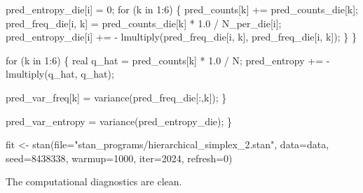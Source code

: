 \documentclass[
  letterpaper,
  DIV=11,
  numbers=noendperiod]{scrartcl}
\newenvironment{Shaded}{\begin{snugshade}}{\end{snugshade}}
\newcommand{\AttributeTok}[1]{\textcolor[rgb]{0.40,0.45,0.13}{#1}}
\newcommand{\ControlFlowTok}[1]{\textcolor[rgb]{0.00,0.23,0.31}{#1}}
\newcommand{\DataTypeTok}[1]{\textcolor[rgb]{0.68,0.00,0.00}{#1}}
\newcommand{\DecValTok}[1]{\textcolor[rgb]{0.68,0.00,0.00}{#1}}
\newcommand{\FloatTok}[1]{\textcolor[rgb]{0.68,0.00,0.00}{#1}}
\newcommand{\FunctionTok}[1]{\textcolor[rgb]{0.28,0.35,0.67}{#1}}
\newcommand{\NormalTok}[1]{\textcolor[rgb]{0.00,0.23,0.31}{#1}}
\newcommand{\OtherTok}[1]{\textcolor[rgb]{0.00,0.23,0.31}{#1}}
\newcommand{\SpecialCharTok}[1]{\textcolor[rgb]{0.37,0.37,0.37}{#1}}
\newcommand{\StringTok}[1]{\textcolor[rgb]{0.13,0.47,0.30}{#1}}
\begin{document}
\begin{codelisting}
\begin{Shaded}
\begin{Highlighting}[]
\NormalTok{    pred\_entropy\_die[i] = }\DecValTok{0}\NormalTok{;}
    \ControlFlowTok{for}\NormalTok{ (k }\ControlFlowTok{in} \DecValTok{1}\NormalTok{:}\DecValTok{6}\NormalTok{) \{}
\NormalTok{      pred\_counts[k] += pred\_counts\_die[k];}
\NormalTok{      pred\_freq\_die[i, k] = pred\_counts\_die[k] * }\FloatTok{1.0}\NormalTok{ / N\_per\_die[i];}
\NormalTok{      pred\_entropy\_die[i] += {-} lmultiply(pred\_freq\_die[i, k],}
\NormalTok{                                         pred\_freq\_die[i, k]);}
\NormalTok{    \}}
\NormalTok{  \}}

  \ControlFlowTok{for}\NormalTok{ (k }\ControlFlowTok{in} \DecValTok{1}\NormalTok{:}\DecValTok{6}\NormalTok{) \{}
    \DataTypeTok{real}\NormalTok{ q\_hat = pred\_counts[k] * }\FloatTok{1.0}\NormalTok{ / N;}
\NormalTok{    pred\_entropy += {-} lmultiply(q\_hat, q\_hat);}

\NormalTok{    pred\_var\_freq[k] = variance(pred\_freq\_die[:,k]);}
\NormalTok{  \}}

\NormalTok{  pred\_var\_entropy = variance(pred\_entropy\_die);}
\NormalTok{\}}
\end{Highlighting}
\end{Shaded}

\end{codelisting}

\begin{Shaded}
\begin{Highlighting}[]
\NormalTok{fit }\OtherTok{\textless{}{-}} \FunctionTok{stan}\NormalTok{(}\AttributeTok{file=}\StringTok{"stan\_programs/hierarchical\_simplex\_2.stan"}\NormalTok{,}
            \AttributeTok{data=}\NormalTok{data, }\AttributeTok{seed=}\DecValTok{8438338}\NormalTok{,}
            \AttributeTok{warmup=}\DecValTok{1000}\NormalTok{, }\AttributeTok{iter=}\DecValTok{2024}\NormalTok{, }\AttributeTok{refresh=}\DecValTok{0}\NormalTok{)}
\end{Highlighting}
\end{Shaded}

The computational diagnostics are clean.

\begin{Shaded}
\end{Shaded}
\end{document}
